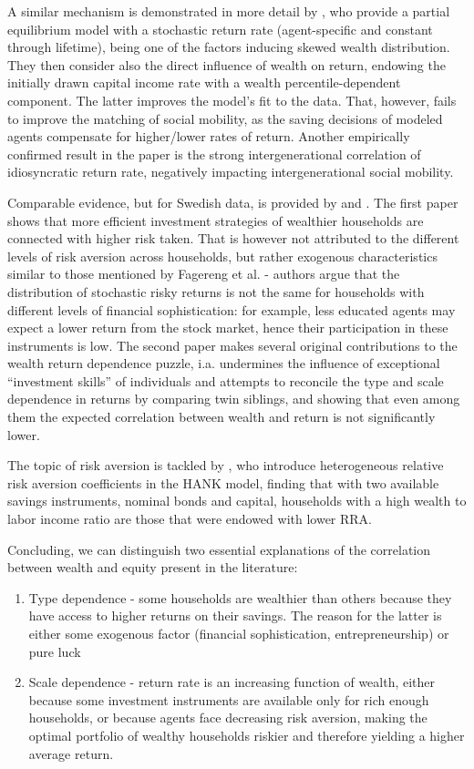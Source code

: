 \documentclass[12pt]{article}
\begin{document}
A similar mechanism is demonstrated in more detail by \textcite{benhabib2019}, who provide a partial equilibrium model with a stochastic return rate (agent-specific and constant through lifetime), being one of the factors inducing skewed wealth distribution. They then consider also the direct influence of wealth on return, endowing the initially drawn capital income rate with a wealth percentile-dependent component. The latter improves the model's fit to the data. That, however, fails to improve the matching of social mobility, as the saving decisions of modeled agents compensate for higher/lower rates of return. Another empirically confirmed result in the paper is the strong intergenerational correlation of idiosyncratic return rate, negatively impacting intergenerational social mobility.

Comparable evidence, but for Swedish data, is provided by \textcite{calvet2007} and \textcite{bach2020}. The first paper shows that more efficient investment strategies of wealthier households are connected with higher risk taken. That is however not attributed to the different levels of risk aversion across households, but rather exogenous characteristics similar to those mentioned by Fagereng et al. - authors argue that the distribution of stochastic risky returns is not the same for households with different levels of financial sophistication: for example, less educated agents may expect a lower return from the stock market, hence their participation in these instruments is low. The second paper makes several original contributions to the wealth return dependence puzzle, i.a. undermines the influence of exceptional “investment skills” of individuals and attempts to reconcile the type and scale dependence in returns by comparing twin siblings, and showing that even among them the expected correlation between wealth and return is not significantly lower.

The topic of risk aversion is tackled by \textcite{kekre2022}, who introduce heterogeneous relative risk aversion coefficients in the HANK model, finding that with two available savings instruments, nominal bonds and capital, households with a high wealth to labor income ratio are those that were endowed with lower RRA.

Concluding, we can distinguish two essential explanations of the correlation between wealth and equity present in the literature:

\begin{enumerate}
    \item Type dependence - some households are wealthier than others because they have access to higher returns on their savings. The reason for the latter is either some exogenous factor (financial sophistication, entrepreneurship) or pure luck
    \item Scale dependence - return rate is an increasing function of wealth, either because some investment instruments are available only for rich enough households, or because agents face decreasing risk aversion, making the optimal portfolio of wealthy households riskier and therefore yielding a higher average return.
\end{enumerate}
\end{document}
